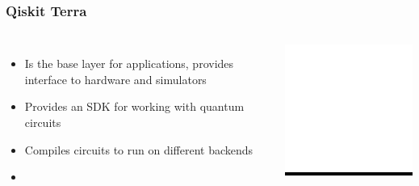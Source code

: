 \documentclass[aspectratio=169,11pt,hyperref={colorlinks=true}]{beamer}
\begin{document}
\begin{frame}
    \frametitle{Qiskit Terra}
    \begin{columns}
           \begin{itemize}
                \item Is the base layer for applications, provides interface to hardware and simulators
                \item Provides an SDK for working with quantum circuits
                \item Compiles circuits to run on different backends
                \item
           \end{itemize}
            \centering
            \colorbox{black}{\includegraphics[width=.5\textwidth]{qiskit-terra-logo.png}}
    \end{columns}
\end{frame}
\end{document}
